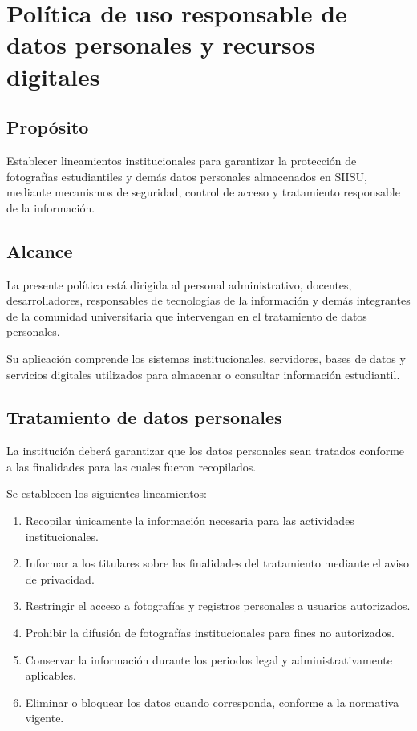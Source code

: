 \documentclass[12pt]{article}
\begin{document}
\section{Política de uso responsable de datos
personales y recursos digitales}

\subsection{Propósito}

Establecer lineamientos institucionales para
garantizar la protección de fotografías
estudiantiles y demás datos personales
almacenados en SIISU, mediante mecanismos
de seguridad, control de acceso y
tratamiento responsable de la información.

\subsection{Alcance}

La presente política está dirigida
al personal administrativo, docentes,
desarrolladores, responsables de
tecnologías de la información y
demás integrantes de la comunidad
universitaria que intervengan en
el tratamiento de datos personales.

Su aplicación comprende los sistemas
institucionales, servidores, bases de
datos y servicios digitales utilizados
para almacenar o consultar información
estudiantil.

\subsection{Tratamiento de datos personales}

La institución deberá garantizar
que los datos personales sean
tratados conforme a las finalidades
para las cuales fueron recopilados.

Se establecen los siguientes lineamientos:

\begin{enumerate}
    \item Recopilar únicamente la
    información necesaria para
    las actividades institucionales.

    \item Informar a los titulares
    sobre las finalidades del
    tratamiento mediante el
    aviso de privacidad.

    \item Restringir el acceso a
    fotografías y registros
    personales a usuarios autorizados.

    \item Prohibir la difusión
    de fotografías institucionales
    para fines no autorizados.

    \item Conservar la información
    durante los periodos legal
    y administrativamente aplicables.

    \item Eliminar o bloquear los
    datos cuando corresponda,
    conforme a la normativa vigente.
\end{enumerate}
\end{document}
